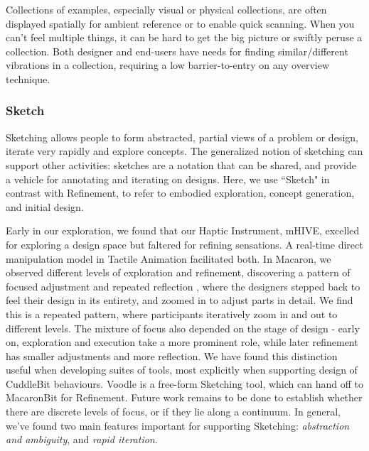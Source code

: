     Collections of examples, especially visual or physical collections, are often displayed spatially for ambient reference or to enable quick scanning.
    When you can't feel multiple things, it can be hard to get the big picture or swiftly peruse a collection.
    Both designer and end-users have needs for finding similar/different vibrations in a collection, requiring a low barrier-to-entry on any overview technique.


%
%
\subsubsection{Sketch}
Sketching allows people to form abstracted, partial views of a problem or design, iterate very rapidly and explore concepts.
The generalized notion of sketching can support other activities: sketches are a notation that can be shared, and provide a vehicle for annotating and iterating on designs.
Here, we use ``Sketch" in contrast with Refinement, to refer to embodied exploration, concept generation, and initial design.

Early in our exploration, we found that our Haptic Instrument, mHIVE, excelled for exploring a design space but faltered for refining sensations.
A real-time direct manipulation model in Tactile Animation facilitated both.
In Macaron, we observed different levels of exploration and refinement, discovering a pattern of focused adjustment and repeated reflection \cite{Schon1982}, where the designers stepped back to feel their design in its entirety, and zoomed in to adjust parts in detail.
We find this is a repeated pattern, where participants iteratively zoom in and out to different levels.
The mixture of focus also depended on the stage of design - early on, exploration and execution take a more prominent role, while later refinement has smaller adjustments and more reflection.
We have found this distinction useful when developing suites of tools, most explicitly when supporting design of CuddleBit behaviours.
Voodle is a free-form Sketching tool, which can hand off to MacaronBit for Refinement.
Future work remains to be done to establish whether there are discrete levels of focus, or if they lie along a continuum.
In general, we've found two main features important for supporting Sketching: \textit{abstraction and ambiguity}, and \textit{rapid iteration}.


%



